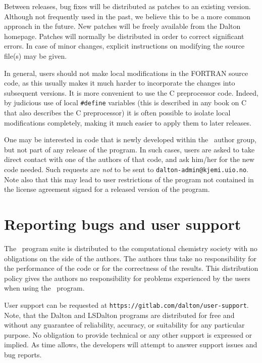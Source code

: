 Between releases, bug fixes will be distributed as
patches to an
existing version. Although not frequently used in the past, we believe
this to be a more common approach in the future. New patches will be
freely available from the Dalton homepage.
Patches will normally be distributed in order to correct
significant errors. In case of minor changes, explicit
instructions on modifying the source file(s) may be given.

In general, users should not make local
modifications in the FORTRAN source code, as this usually makes it
much harder to incorporate the changes into subsequent versions.
It is more convenient to use the C preprocessor code.  Indeed, by
judicious use of local \verb|#define| variables (this
is described in any book on C that also describes the C
preprocessor) it is often possible to isolate local
modifications completely, making it much easier
to apply them to later
releases.

One may be interested in code that is newly developed within the
\dalton\ author group, but not part of any release of the program. In
such cases, users are asked to take direct contact with one of the
authors of that code, and ask him/her for the new code
needed. Such requests are {\em not} to be sent to
\verb|dalton-admin@kjemi.uio.no|. Note also that this may lead to user
restrictions of the program not contained in the license agreement
signed for a released version of the program.

\section{Reporting bugs and user support}

The \latestrelease\ program suite is distributed to the computational chemistry
society with no obligations on the side of the
authors. The authors thus take no responsibility
for the performance
of the code or for the correctness of the
results. This distribution
policy gives the authors no responsibility for problems experienced by
the users when using the \dalton\ program.

User support can be requested at \verb|https://gitlab.com/dalton/user-support|.
Note, that the Dalton and LSDalton programs are distributed for free
and without any guarantee of reliability, accuracy, or suitability for any
particular purpose. No obligation to provide technical or any other support is
expressed or implied. As time allows, the developers will attempt to answer support
issues and bug reports.

